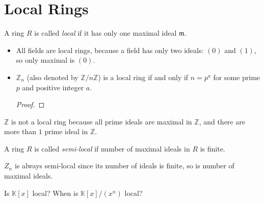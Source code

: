 \section{Local Rings}
\begin{definition}
    A ring \(R\) is called \emph{local} if it has only one maximal ideal \(\mathfrak{m}\).
\end{definition}
\begin{example}
    \begin{itemize}
        \item All fields are local rings, because a field has only two ideals: \((0)\) and \((1)\), so only maximal is \((0)\).
        \item \(\mathbb{Z}_n\) (also denoted by \(\mathbb{Z}/n\mathbb{Z}\)) is a local ring if and only if \(n = p^a\) for some prime \(p\) and positive integer \(a\).
            \begin{proof}
                
            \end{proof}

%


    \end{itemize}
\end{example}
\begin{nonexample}
    \(\mathbb{Z}\) is not a local ring because all prime ideals are maximal in \(\mathbb{Z}\), and there are more than \( 1 \) prime ideal in  \( \mathbb{Z} \).
\end{nonexample}
\begin{definition}
    A ring \(R\) is called \emph{semi-local} if number of maximal ideals in \(R\) is finite.
\end{definition}
\begin{example}
    \(Z_n\) is always semi-local since its number of ideals is finite, so is number of maximal ideals.
\end{example}
\begin{exercise}
    Is \(\mathbb{K}[x]\) local? When is \(\mathbb{K}[x]/(x^n)\) local?

\end{exercise}
